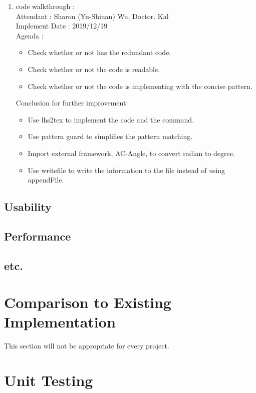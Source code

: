 \documentclass[12pt, titlepage]{article}
\begin{document}
\begin{enumerate}
\item code walkthrough : \\
Attendant : Sharon (Yu-Shiuan) Wu, Doctor. Kal\\
Implement Date : 2019/12/19\\
Agenda : \\
\begin{itemize}
\item Check whether or not has the redundant code.
\item Check whether or not the code is readable.
\item Check whether or not the code is implementing with the concise pattern.
\end{itemize}

Conclusion for further improvement:
\begin{itemize}
\item Use lhs2tex to implement the code and the command.
\item Use pattern guard to simplifies the pattern matching.
\item Import external framework, AC-Angle, to convert radian to degree.
\item Use writefile to write the information to the file instead of using appendFile.
\end{itemize}

\end{enumerate}
\subsection{Usability}
		
\subsection{Performance}

\subsection{etc.}
	
\section{Comparison to Existing Implementation}	

This section will not be appropriate for every project.

\section{Unit Testing}
\end{document}
